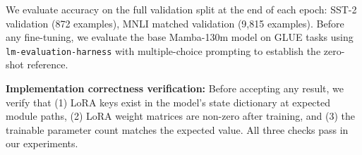 We evaluate accuracy on the full validation split at the end of each epoch: SST-2 validation (872 examples), MNLI matched validation (9,815 examples). Before any fine-tuning, we evaluate the base Mamba-130m model on GLUE tasks using \texttt{lm-evaluation-harness} \citep{eval_harness} with multiple-choice prompting to establish the zero-shot reference.

\textbf{Implementation correctness verification:} Before accepting any result, we verify that (1) LoRA keys exist in the model's state dictionary at expected module paths, (2) LoRA weight matrices are non-zero after training, and (3) the trainable parameter count matches the expected value. All three checks pass in our experiments.
